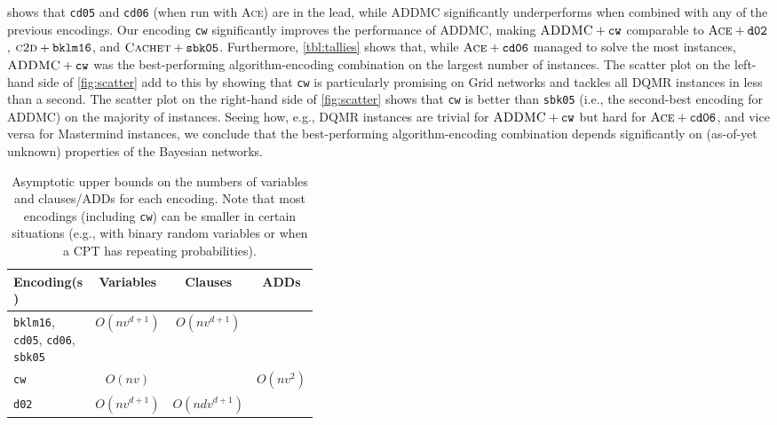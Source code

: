  shows that \texttt{cd05}
\citep{DBLP:conf/ijcai/ChaviraD05} and \texttt{cd06}
\citep{DBLP:conf/sat/ChaviraD06} (when run with \textsc{Ace}) are in the lead,
while \textsc{ADDMC} \citep{DBLP:conf/aaai/DudekPV20} significantly
underperforms when combined with any of the previous encodings. Our encoding
\texttt{cw} significantly improves the performance of \textsc{ADDMC}, making
$\textsc{ADDMC}+\texttt{cw}$ comparable to $\textsc{Ace}+\texttt{d02}$,
$\textsc{c2d}+\texttt{bklm16}$, and $\textsc{Cachet}+\texttt{sbk05}$.
Furthermore, \cref{tbl:tallies} shows that, while $\textsc{Ace}+\texttt{cd06}$
managed to solve the most instances, $\textsc{ADDMC}+\texttt{cw}$ was the
best-performing algorithm-encoding combination on the largest number of
instances. The scatter plot on the left-hand side of \cref{fig:scatter} add to
this by showing that \texttt{cw} is particularly promising on Grid networks and
tackles all DQMR instances in less than a second. The scatter plot on the
right-hand side of \cref{fig:scatter} shows that \texttt{cw} is better than
\texttt{sbk05} \citep{DBLP:conf/aaai/SangBK05} (i.e., the second-best encoding
for \textsc{ADDMC}) on the majority of instances. Seeing how, e.g., DQMR
instances are trivial for $\textsc{ADDMC}+\texttt{cw}$ but hard for
$\textsc{Ace}+\texttt{cd06}$, and vice versa for Mastermind instances, we
conclude that the best-performing algorithm-encoding combination depends
significantly on (as-of-yet unknown) properties of the Bayesian networks.

\begin{table}[t]
  \centering
  \begin{tabular}{m{0.4\linewidth} c c c}
    \toprule
    Encoding(s) & Variables & Clauses & ADDs \\
    \midrule
    \texttt{bklm16}, \texttt{cd05}, \texttt{cd06}, \texttt{sbk05} & $O(nv^{d+1})$ & $O(nv^{d+1})$ & \\
    \texttt{cw} & $O(nv)$ & & $O(nv^2)$ \\
    \texttt{d02} & $O(nv^{d+1})$ & $O(ndv^{d+1})$ & \\
    \bottomrule
  \end{tabular}
  \caption{Asymptotic upper bounds on the numbers of variables and clauses/ADDs
    for each encoding. Note that most encodings (including \texttt{cw}) can be
    smaller in certain situations (e.g., with binary random variables or when a
    CPT has repeating probabilities).}\label{tbl:asymptotes}
\end{table}

